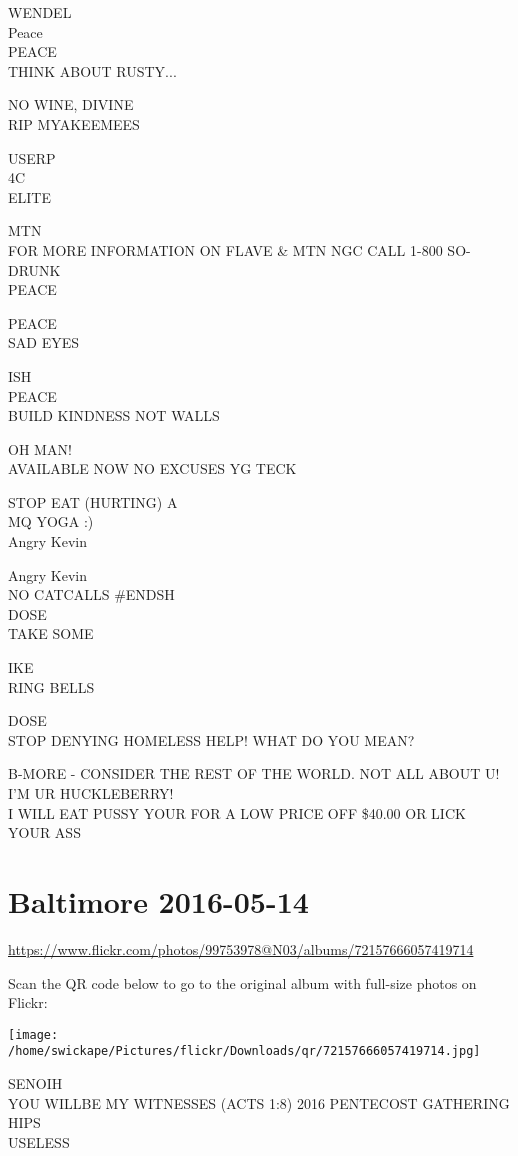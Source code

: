 \documentclass[10pt,letterpaper]{article}
\begin{document}
WENDEL\\
Peace\\
PEACE\\
THINK ABOUT RUSTY...

NO WINE, DIVINE\\
RIP MYAKEEMEES

USERP\\
4C\\
ELITE

MTN\\
FOR MORE INFORMATION ON FLAVE \& MTN NGC CALL 1{-}800 SO{-}DRUNK\\
PEACE

PEACE\\
SAD EYES

ISH\\
PEACE\\
BUILD KINDNESS NOT WALLS

OH MAN!\\
AVAILABLE NOW NO EXCUSES YG TECK

STOP EAT (HURTING) A\\
MQ YOGA :)\\
Angry Kevin

Angry Kevin\\
NO CATCALLS \#ENDSH\\
DOSE\\
TAKE SOME

IKE\\
RING BELLS

DOSE\\
STOP DENYING HOMELESS HELP!  WHAT DO YOU MEAN?

B{-}MORE {-} CONSIDER THE REST OF THE WORLD.  NOT ALL ABOUT U!  I'M UR HUCKLEBERRY!\\
I WILL EAT PUSSY YOUR FOR A LOW PRICE OFF \$40.00 OR LICK YOUR ASS
\pagebreak

\section*{Baltimore 2016-05-14}

\url{https://www.flickr.com/photos/99753978@N03/albums/72157666057419714}

Scan the QR code below to go to the original album with full-size photos on Flickr:

\texttt{[image: /home/swickape/Pictures/flickr/Downloads/qr/72157666057419714.jpg]}
\pagebreak

SENOIH\\
YOU WILLBE MY WITNESSES (ACTS 1:8) 2016 PENTECOST GATHERING\\
HIPS\\
USELESS
\end{document}
